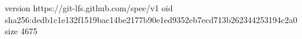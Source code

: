 version https://git-lfs.github.com/spec/v1
oid sha256:dedb1c1e132f1519bac14be2177b90e1ed9352eb7ecd713b262344253194c2a0
size 4675
